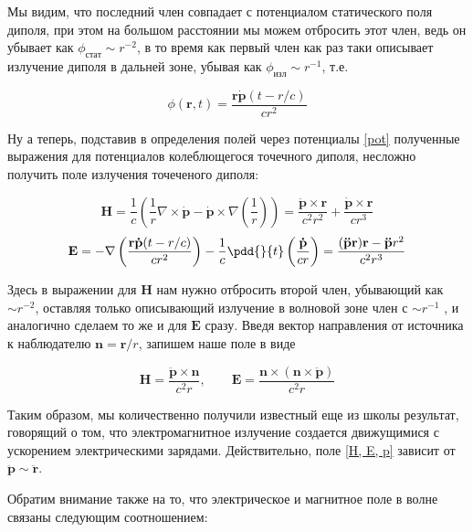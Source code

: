 \documentclass[12pt]{kiarticle}
\begin{document}
Мы видим, что последний член совпадает с потенциалом статического поля диполя, при этом на большом расстоянии мы можем отбросить этот член, ведь он убывает как $ \phi_{стат} \sim r^{-2} $, в то время как первый член как раз таки описывает излучение диполя в дальней зоне, убывая как $ \phi_{изл} \sim r^{-1} $, т.е. 

\begin{equation}\label{phi_p}
\phi (\mathbf{r}, t) =\dfrac{ \mathbf{r\dot{p}}(t - r/c)}{cr^2}
\end{equation}

Ну а теперь, подставив в определения полей через потенциалы \eqref{pot} полученные выражения для потенциалов колеблющегося точечного диполя, несложно получить поле излучения точеченого диполя:

\begin{equation}\label{}
\mathbf{H} = \dfrac{1}{c} \left( \dfrac{1}{r} \nabla \times \mathbf{\dot{p}}  - \mathbf{\dot{p}} \times \nabla \left( \dfrac{1}{r} \right) \right) = \dfrac{\mathbf{\ddot{p} \times r}}{c^2r^2} + \dfrac{\mathbf{\dot{p} \times r}}{cr^3}
\end{equation}
\begin{equation}\label{}
\mathbf{E} = - \nabla \left( \dfrac{ \mathbf{r\dot{p}}(t - r/c)}{cr^2} \right)  - \dfrac{1}{c} \pdd{}{t} \left( \dfrac{\mathbf{\dot{p}}}{cr} \right) = \dfrac{\mathbf{(\ddot{p}r)r} -\mathbf{\ddot{p}}r^2}{c^2r^3} 
\end{equation}

Здесь в выражении для $ \mathbf{H} $ нам нужно отбросить второй член, убывающий как $ \sim r^{-2} $, оставляя только описывающий излучение в волновой зоне член с $ \sim r^{-1} $ , и аналогично сделаем то же и для $ \mathbf{E} $ сразу. Введя вектор направления от источника к наблюдателю $ \mathbf{n} = \mathbf{r}/r $, запишем наше поле в виде

\begin{equation}\label{H, E, p}
\mathbf{H} = \dfrac{\mathbf{\ddot{p} \times n}}{c^2r}, \qquad \mathbf{E} = \dfrac{\mathbf{n \times (n \times \ddot{p})}}{c^2r}
\end{equation}

Таким образом, мы количественно получили известный еще из школы результат, говорящий о том, что электромагнитное излучение создается движущимися с ускорением электрическими зарядами. Действительно, поле \eqref{H, E, p} зависит от $ \mathbf{\ddot{p}} \sim \mathbf{\ddot{r}} $.

Обратим внимание также на то, что электрическое и магнитное поле в волне связаны следующим соотношением: 
\end{document}
